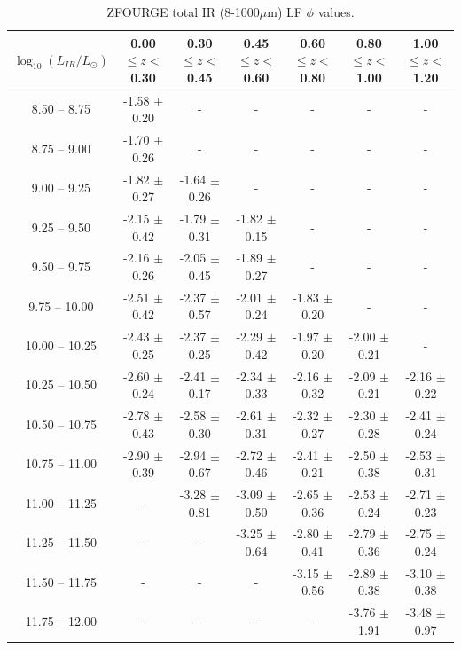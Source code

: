 \begin{landscape}
    \begin{table}
    \begin{center}
    \caption{ZFOURGE total IR (8-1000$\mu$m) LF $\phi$ values.}
    \label{Tab: ZF LF}
    \begin{tabular}{@{}ccccccc@{}}
        \toprule
        $\log_{10}(L_{IR}/L_{\odot})$ & 0.00 $\leq z <$ 0.30 & 0.30 $\leq z <$ 0.45 & 0.45 $\leq z <$ 0.60 & 0.60 $\leq z <$ 0.80 & 0.80 $\leq z <$ 1.00 & 1.00 $\leq z <$ 1.20 \\
        \hline
         8.50 --  8.75 & -1.58 $\pm$ 0.20 & - & - & - & - & - \\
         8.75 --  9.00 & -1.70 $\pm$ 0.26 & - & - & - & - & - \\
         9.00 --  9.25 & -1.82 $\pm$ 0.27 & -1.64 $\pm$ 0.26 & - & - & - & - \\
         9.25 --  9.50 & -2.15 $\pm$ 0.42 & -1.79 $\pm$ 0.31 & -1.82 $\pm$ 0.15 & - & - & - \\
         9.50 --  9.75 & -2.16 $\pm$ 0.26 & -2.05 $\pm$ 0.45 & -1.89 $\pm$ 0.27 & - & - & - \\
         9.75 -- 10.00 & -2.51 $\pm$ 0.42 & -2.37 $\pm$ 0.57 & -2.01 $\pm$ 0.24 & -1.83 $\pm$ 0.20 & - & - \\
        10.00 -- 10.25 & -2.43 $\pm$ 0.25 & -2.37 $\pm$ 0.25 & -2.29 $\pm$ 0.42 & -1.97 $\pm$ 0.20 & -2.00 $\pm$ 0.21 & - \\
        10.25 -- 10.50 & -2.60 $\pm$ 0.24 & -2.41 $\pm$ 0.17 & -2.34 $\pm$ 0.33 & -2.16 $\pm$ 0.32 & -2.09 $\pm$ 0.21 & -2.16 $\pm$ 0.22 \\
        10.50 -- 10.75 & -2.78 $\pm$ 0.43 & -2.58 $\pm$ 0.30 & -2.61 $\pm$ 0.31 & -2.32 $\pm$ 0.27 & -2.30 $\pm$ 0.28 & -2.41 $\pm$ 0.24 \\
        10.75 -- 11.00 & -2.90 $\pm$ 0.39 & -2.94 $\pm$ 0.67 & -2.72 $\pm$ 0.46 & -2.41 $\pm$ 0.21 & -2.50 $\pm$ 0.38 & -2.53 $\pm$ 0.31 \\
        11.00 -- 11.25 & -                & -3.28 $\pm$ 0.81 & -3.09 $\pm$ 0.50 & -2.65 $\pm$ 0.36 & -2.53 $\pm$ 0.24 & -2.71 $\pm$ 0.23 \\
        11.25 -- 11.50 & -                & -                & -3.25 $\pm$ 0.64 & -2.80 $\pm$ 0.41 & -2.79 $\pm$ 0.36 & -2.75 $\pm$ 0.24 \\
        11.50 -- 11.75 & -                & -                & -                & -3.15 $\pm$ 0.56 & -2.89 $\pm$ 0.38 & -3.10 $\pm$ 0.38 \\
        11.75 -- 12.00 & -                & -                & -                & -                & -3.76 $\pm$ 1.91 & -3.48 $\pm$ 0.97 \\

\end{tabular}
\end{center}
\end{table}
\end{landscape}
